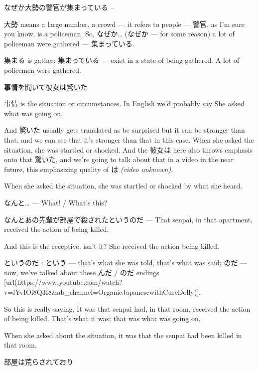 なぜか大勢の警官が集まっている --

{}

大勢 means a large number, a crowd --- it refers to people --- 警官, as I'm sure you know, is a policeman. So, なぜか\ldots{} (なぜか --- for some reason) a lot of policeman were gathered --- 集まっている.

集まる is gather; 集まっている --- exist in a state of being gathered. A lot of policemen were gathered.

事情を聞いて彼女は驚いた

{}

事情 is the situation or circumstances. In English we'd probably say She asked what was going on.

And 驚いた usually gets translated as be surprised but it can be stronger than that, and we can see that it's stronger than that in this case. When she asked the situation, she was startled or shocked. And the 彼女は here also throws emphasis onto that 驚いた, and we're going to talk about that in a video in the near future, this emphasizing quality of は {\em (video unknown)}.

When she asked the situation, she was startled or shocked by what she heard.

なんと\ldots{} --- What! / What's this?

なんとあの先輩が部屋で殺されたというのだ --- That senpai, in that apartment, received the action of being killed.

{}

And this is the receptive, isn't it? She received the action being killed.

というのだ : という --- that's what she was told, that's what was said; のだ --- now, we've talked about these んだ / のだ endings [url(https://www.youtube.com/watch?v=lYvIOi8Q3I8&ab_channel=OrganicJapanesewithCureDolly)].

So this is really saying, It was that senpai had, in that room, received the action of being killed. That's what it was; that was what was going on.

When she asked about the situation, it was that the senpai had been killed in that room.

\thinrule

部屋は荒らされており

{}

